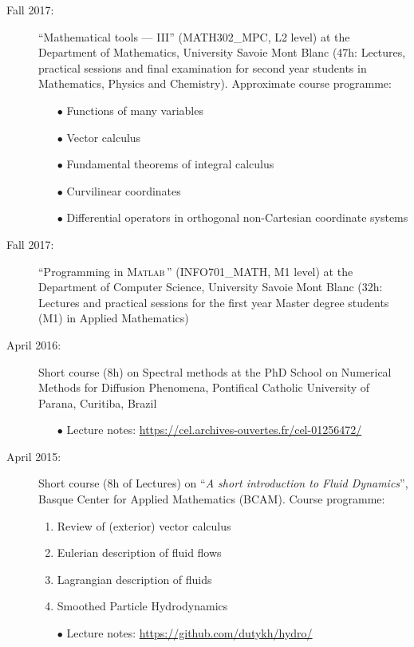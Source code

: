 \begin{description}
        \item[Fall 2017:] ``Mathematical tools --- III'' (MATH302\_MPC, L2 level) at the Department of Mathematics, University Savoie Mont Blanc (47h: Lectures, practical sessions and final examination for second year students in Mathematics, Physics and Chemistry). Approximate course programme:
        \begin{itemize}
            \item[$\bullet$] Functions of many variables
            \item[$\bullet$] Vector calculus
            \item[$\bullet$] Fundamental theorems of integral calculus
            \item[$\bullet$] Curvilinear coordinates
            \item[$\bullet$] Differential operators in orthogonal non-Cartesian coordinate systems
        \end{itemize}
        \item[Fall 2017:] ``Programming in \textsc{Matlab}\texttrademark\,'' (INFO701\_MATH, M1 level) at the Department of Computer Science, University Savoie Mont Blanc (32h: Lectures and practical sessions for the first year Master degree students (M1) in Applied Mathematics\textbf{})
        \item[April 2016:] Short course (8h) on Spectral methods at the PhD School on Numerical Methods for Diffusion Phenomena, Pontifical Catholic University of Parana, Curitiba, Brazil
        \begin{itemize}
            \item[$\bullet$] Lecture notes: \url{https://cel.archives-ouvertes.fr/cel-01256472/}
        \end{itemize}
        \item[April 2015:] Short course (8h of Lectures) on ``\textit{A short introduction to Fluid Dynamics}'', Basque Center for Applied Mathematics (BCAM). Course programme:
        \begin{enumerate}
            \item Review of (exterior) vector calculus
            \item Eulerian description of fluid flows
            \item Lagrangian description of fluids
            \item Smoothed Particle Hydrodynamics
            \item[$\bullet$] Lecture notes: \url{https://github.com/dutykh/hydro/}
        \end{enumerate}

\end{description}
